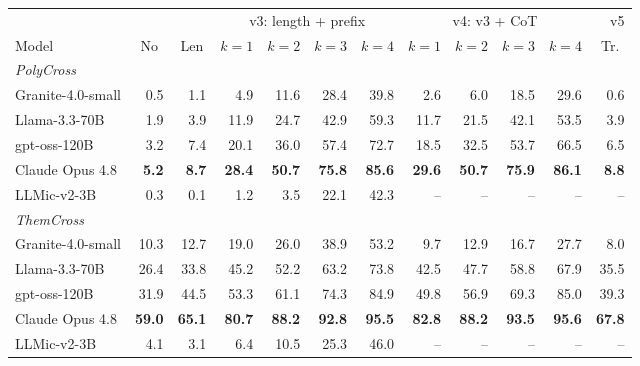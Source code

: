 \begin{tabular}{lrrrrrrrrrrr}
\toprule
 & \multicolumn{2}{c}{} & \multicolumn{4}{c}{v3: length + prefix} & \multicolumn{4}{c}{v4: v3 + CoT} & v5 \\
\cmidrule(lr){4-7}\cmidrule(lr){8-11}
Model & \multicolumn{1}{c}{No} & \multicolumn{1}{c}{Len} & $k{=}1$ & $k{=}2$ & $k{=}3$ & $k{=}4$ & $k{=}1$ & $k{=}2$ & $k{=}3$ & $k{=}4$ & \multicolumn{1}{c}{Tr.} \\
\midrule
\multicolumn{12}{l}{\textit{PolyCross}} \\
\quad Granite-4.0-small & 0.5 & 1.1 & 4.9 & 11.6 & 28.4 & 39.8 & 2.6 & 6.0 & 18.5 & 29.6 & 0.6 \\
\quad Llama-3.3-70B & 1.9 & 3.9 & 11.9 & 24.7 & 42.9 & 59.3 & 11.7 & 21.5 & 42.1 & 53.5 & 3.9 \\
\quad gpt-oss-120B & 3.2 & 7.4 & 20.1 & 36.0 & 57.4 & 72.7 & 18.5 & 32.5 & 53.7 & 66.5 & 6.5 \\
\quad Claude Opus 4.8 & \textbf{5.2} & \textbf{8.7} & \textbf{28.4} & \textbf{50.7} & \textbf{75.8} & \textbf{85.6} & \textbf{29.6} & \textbf{50.7} & \textbf{75.9} & \textbf{86.1} & \textbf{8.8} \\
\quad LLMic-v2-3B & 0.3 & 0.1 & 1.2 & 3.5 & 22.1 & 42.3 & -- & -- & -- & -- & -- \\
\midrule
\multicolumn{12}{l}{\textit{ThemCross}} \\
\quad Granite-4.0-small & 10.3 & 12.7 & 19.0 & 26.0 & 38.9 & 53.2 & 9.7 & 12.9 & 16.7 & 27.7 & 8.0 \\
\quad Llama-3.3-70B & 26.4 & 33.8 & 45.2 & 52.2 & 63.2 & 73.8 & 42.5 & 47.7 & 58.8 & 67.9 & 35.5 \\
\quad gpt-oss-120B & 31.9 & 44.5 & 53.3 & 61.1 & 74.3 & 84.9 & 49.8 & 56.9 & 69.3 & 85.0 & 39.3 \\
\quad Claude Opus 4.8 & \textbf{59.0} & \textbf{65.1} & \textbf{80.7} & \textbf{88.2} & \textbf{92.8} & \textbf{95.5} & \textbf{82.8} & \textbf{88.2} & \textbf{93.5} & \textbf{95.6} & \textbf{67.8} \\
\quad LLMic-v2-3B & 4.1 & 3.1 & 6.4 & 10.5 & 25.3 & 46.0 & -- & -- & -- & -- & -- \\
\bottomrule
\end{tabular}

